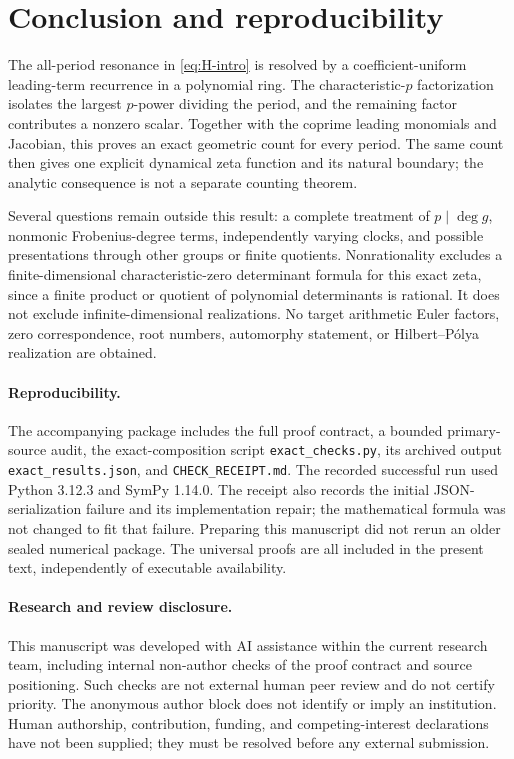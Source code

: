 \section{Conclusion and reproducibility}

The all-period resonance in \eqref{eq:H-intro} is resolved by a
coefficient-uniform leading-term recurrence in a polynomial ring.
The characteristic-$p$ factorization isolates the largest $p$-power
dividing the period, and the remaining factor contributes a nonzero
scalar. Together with the coprime leading monomials and Jacobian,
this proves an exact geometric count for every period. The same count
then gives one explicit dynamical zeta function and its natural
boundary; the analytic consequence is not a separate counting theorem.

Several questions remain outside this result: a complete treatment of
$p\mid\deg g$, nonmonic Frobenius-degree terms, independently varying
clocks, and possible presentations through other groups or finite
quotients. Nonrationality excludes a finite-dimensional
characteristic-zero determinant formula for this exact zeta, since a
finite product or quotient of polynomial determinants is rational.
It does not exclude infinite-dimensional realizations. No target
arithmetic Euler factors, zero correspondence, root numbers,
automorphy statement, or Hilbert--P\'olya realization are obtained.

\paragraph{Reproducibility.}
The accompanying package includes the full proof contract, a bounded
primary-source audit, the exact-composition script
\texttt{exact\_checks.py}, its archived output
\texttt{exact\_results.json}, and \texttt{CHECK\_RECEIPT.md}.
The recorded successful run used Python 3.12.3 and SymPy 1.14.0.
The receipt also records the initial JSON-serialization failure and
its implementation repair; the mathematical formula was not changed
to fit that failure. Preparing this manuscript did not rerun an older
sealed numerical package. The universal proofs are all included in
the present text, independently of executable availability.

\paragraph{Research and review disclosure.}
This manuscript was developed with AI assistance within the current
research team, including internal non-author checks of the proof
contract and source positioning. Such checks are not external human
peer review and do not certify priority. The anonymous author block
does not identify or imply an institution. Human authorship,
contribution, funding, and competing-interest declarations have not
been supplied; they must be resolved before any external submission.

